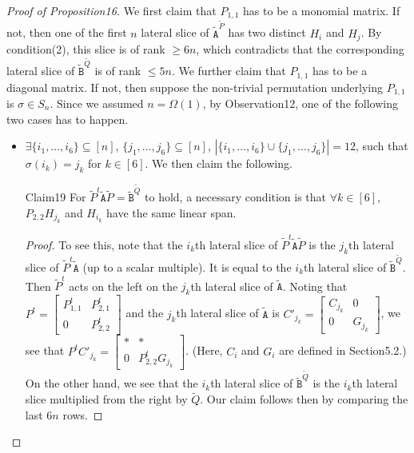 \begin{proof}[Proof of Proposition16]
We first claim that $P_{1,1}$ has to be a monomial matrix. If not, then one of the first $n$ lateral slice of $\widetilde{\mathtt A}^{\widetilde P}$ has two distinct $H_i$ and $H_j$. By condition(2), this slice is of rank $\ge6n$, which contradicts that the corresponding lateral slice of $\widetilde{\mathtt B}^{\widetilde Q}$ is of rank $\le5n$.
We further claim that $P_{1,1}$ has to be a diagonal matrix. If not, then suppose the non-trivial permutation underlying $P_{1,1}$ is $\sigma\in S_n$. Since we assumed $n=\Omega(1)$, by Observation12, one of the following two cases has to happen.
\begin{itemize}
\item $\exists\{i_1,\ldots,i_6\}\subseteq[n]$, $\{j_1,\ldots,j_6\}\subseteq[n]$, $|\{i_1,\ldots,i_6\}\cup\{j_1,\ldots,j_6\}|=12$, such that $\sigma(i_k)=j_k$ for $k\in[6]$. We then claim the following.
\begin{authorclaim}{Claim19}
For $\widetilde P^t\widetilde{\mathtt A}\widetilde P=\widetilde{\mathtt B}^{\widetilde Q}$ to hold, a necessary condition is that $\forall k\in[6]$, $P_{2,2}H_{j_k}$ and $H_{i_k}$ have the same linear span.
\end{authorclaim}
\begin{proof}
To see this, note that the $i_k$th lateral slice of $\widetilde P^t\widetilde{\mathtt A}\widetilde P$ is the $j_k$th lateral slice of $\widetilde P^t\widetilde{\mathtt A}$ (up to a scalar multiple). It is equal to the $i_k$th lateral slice of $\widetilde{\mathtt B}^{\widetilde Q}$. Then $\widetilde P^t$ acts on the left on the $j_k$th lateral slice of $\widetilde{\mathtt A}$. Noting that $P^t=\begin{bmatrix}P_{1,1}^t&P_{2,1}^t\\0&P_{2,2}^t\end{bmatrix}$ and the $j_k$th lateral slice of $\widetilde{\mathtt A}$ is $C'_{j_k}=\begin{bmatrix}C_{j_k}&0\\0&G_{j_k}\end{bmatrix}$, we see that $P^tC'_{j_k}=\begin{bmatrix}*&*\\0&P_{2,2}^tG_{j_k}\end{bmatrix}$. (Here, $C_i$ and $G_i$ are defined in Section5.2.) On the other hand, we see that the $i_k$th lateral slice of $\widetilde{\mathtt B}^{\widetilde Q}$ is the $i_k$th lateral slice multiplied from the right by $\widetilde Q$. Our claim follows then by comparing the last $6n$ rows.
\end{proof}

\end{itemize}
\end{proof}
